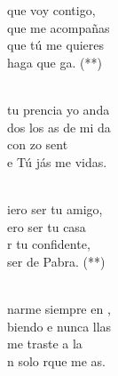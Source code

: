 \documentclass[12pt]{article}
\begin{document}
\begin{multicols*}{2}
\begin{cancion}%
	\begin{chorus}%
	 que voy contigo, \\
	 que me acompañas \\
	 que tú me quieres \\
	haga  que ga. (**)\\
	\end{chorus}%
	\jump\\
	 tu prencia yo anda \\
	dos los as de mi da \\
	con zo sent\\
	e Tú jás me vidas.\\\jump\\
	\begin{chorus}%
	iero ser tu amigo,\\
	ero ser tu casa\\
	r tu confidente,\\
	ser de  Pabra. (**)\\
	\end{chorus}%
	\jump\\
	narme siempre en , \\
	biendo e nunca llas\\
	me traste a la \\
	n solo rque me as.\\
\end{cancion}%


\end{multicols*}
\end{document}
